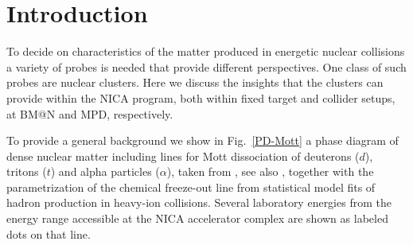 \documentclass[epj]{svjour}
\begin{document}
\section{Introduction}
To decide on characteristics of the matter produced in energetic nuclear collisions a variety of probes is needed that provide different perspectives.
One class of such probes are nuclear clusters.
Here we discuss the insights that the clusters can provide within the NICA program, both within fixed 
target and collider setups, at BM@N and MPD, respectively. 
 
To provide a general background we show in Fig.~\ref{PD-Mott} a phase diagram of dense nuclear matter including lines for Mott dissociation of deuterons ($d$), tritons ($t$) and alpha particles 
($\alpha$), taken from \cite{Schuck:1999eg}, see also \cite{Roepke:1983},  together with the parametrization of the chemical freeze-out line \cite{Begun:2012rf} from statistical model fits of hadron production in heavy-ion collisions. 
Several laboratory energies from the energy range accessible at the 
NICA accelerator complex are shown as labeled dots on that line.
\end{document}
